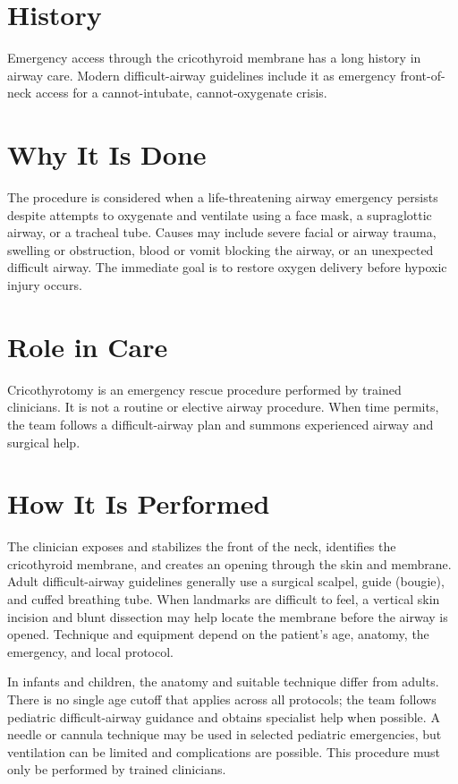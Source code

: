 \section*{History}
Emergency access through the cricothyroid membrane has a long history in airway care. Modern difficult-airway guidelines include it as emergency front-of-neck access for a cannot-intubate, cannot-oxygenate crisis.

\section*{Why It Is Done}
The procedure is considered when a life-threatening airway emergency persists despite attempts to oxygenate and ventilate using a face mask, a supraglottic airway, or a tracheal tube. Causes may include severe facial or airway trauma, swelling or obstruction, blood or vomit blocking the airway, or an unexpected difficult airway. The immediate goal is to restore oxygen delivery before hypoxic injury occurs.

\section*{Role in Care}
Cricothyrotomy is an emergency rescue procedure performed by trained clinicians. It is not a routine or elective airway procedure. When time permits, the team follows a difficult-airway plan and summons experienced airway and surgical help.

\section*{How It Is Performed}
The clinician exposes and stabilizes the front of the neck, identifies the cricothyroid membrane, and creates an opening through the skin and membrane. Adult difficult-airway guidelines generally use a surgical scalpel, guide (bougie), and cuffed breathing tube. When landmarks are difficult to feel, a vertical skin incision and blunt dissection may help locate the membrane before the airway is opened. Technique and equipment depend on the patient's age, anatomy, the emergency, and local protocol.

In infants and children, the anatomy and suitable technique differ from adults. There is no single age cutoff that applies across all protocols; the team follows pediatric difficult-airway guidance and obtains specialist help when possible. A needle or cannula technique may be used in selected pediatric emergencies, but ventilation can be limited and complications are possible. This procedure must only be performed by trained clinicians.

